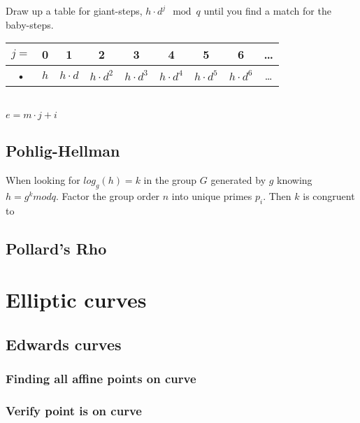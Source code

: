 \documentclass{article}
\begin{document}
Draw up a table for giant-steps, $h \cdot d^j \mod q$ until you find a match for the baby-steps.\\
\begin{tabular}{|c|c|c|c|c|c|c|c|c|}
\hline
$j = $ & 0 & 1 & 2 & 3 & 4 & 5 & 6 & \ldots \\
\hline
• & $h$ & $h \cdot d$ & $h \cdot d^2$ & $h \cdot d^3$ & $h \cdot d^4$ & $h \cdot d^5$ & $h \cdot d^6$ & \ldots \\
\hline
\end{tabular} \\
$e = m \cdot j + i$

\subsection{Pohlig-Hellman}
When looking for $log_g(h) = k$ in the group $G$ generated by $g$ knowing $h = g^k mod q$.
Factor the group order $n$ into unique primes $p_i$.
Then $k$ is congruent to 


\subsection{Pollard's Rho}


\section{Elliptic curves}
\subsection{Edwards curves}
\subsubsection{Finding all affine points on curve}


\subsubsection{Verify point is on curve}
\end{document}
